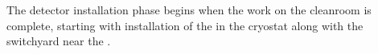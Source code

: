 The detector installation phase begins when the work on the cleanroom is complete, starting with installation of the   in the cryostat along with the switchyard near the . 
          

